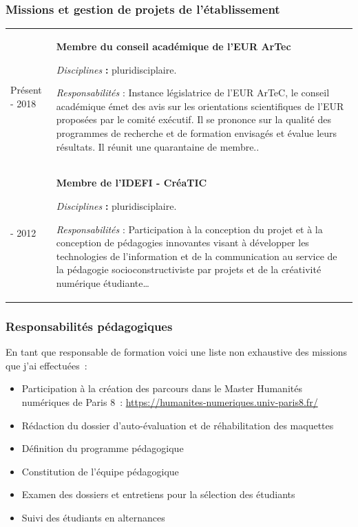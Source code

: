 \documentclass[
  a4paper,
  DIV=11,
  numbers=noendperiod]{scrreprt}
\begin{document}
\subsubsection{\texorpdfstring{\textbf{Missions et gestion de projets de
l'établissement}}{Missions et gestion de projets de l'établissement}}\label{missions-et-gestion-de-projets-de-luxe9tablissement}

\begin{longtable}[]{@{}
  >{\raggedright\arraybackslash}p{}
  >{\raggedright\arraybackslash}p{}@{}}
\toprule\noalign{}
\endhead
\bottomrule\noalign{}
\endlastfoot
Présent - 2018 & \textbf{Membre du conseil académique de l'EUR ArTec}

\emph{Disciplines} \textbf{:} pluridisciplaire.

\emph{Responsabilités} : Instance législatrice de l'EUR ArTeC, le
conseil académique émet des avis sur les orientations scientifiques de
l'EUR proposées par le comité exécutif. Il se prononce sur la qualité
des programmes de recherche et de formation envisagés et évalue leurs
résultats. Il réunit une quarantaine de membre.. \\
2019 - 2012 & \textbf{Membre de l'IDEFI - CréaTIC}

\emph{Disciplines} \textbf{:} pluridisciplaire.

\emph{Responsabilités} : Participation à la conception du projet et à la
conception de pédagogies innovantes visant à développer les technologies
de l'information et de la communication au service de la pédagogie
socioconstructiviste par projets et de la créativité numérique
étudiante\ldots{} \\
\end{longtable}

\subsubsection*{\texorpdfstring{\textbf{Responsabilités
pédagogiques}}{Responsabilités pédagogiques}}\label{responsabilituxe9s-puxe9dagogiques}

En tant que responsable de formation voici une liste non exhaustive des
missions que j'ai effectuées~:~

\begin{itemize}
\item
  Participation à la création des parcours dans le Master Humanités
  numériques de Paris 8~:
  \url{https://humanites-numeriques.univ-paris8.fr/}
\item
  Rédaction du dossier d'auto-évaluation et de réhabilitation des
  maquettes
\item
  Définition du programme pédagogique
\item
  Constitution de l'équipe pédagogique
\item
  Examen des dossiers et entretiens pour la sélection des étudiants
\item
  Suivi des étudiants en alternances
\end{itemize}
\end{document}
